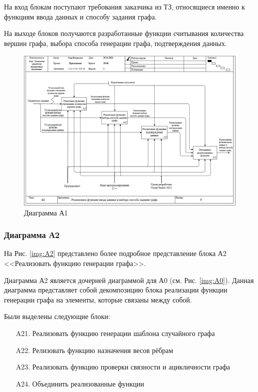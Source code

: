 \documentclass[a4paper, final]{article}
\begin{document}
На вход блокам поступают требования заказчика из ТЗ, относящиеся именно к функциям ввода данных и способу 
задания графа.

На выходе блоков получаются разработанные функции считывания количества вершин графа, выбора способа генерации графа,
подтверждения данных.
\newpage
\begin{figure}[H]
	\centering
	\includegraphics[width=\linewidth]{A1.png}
	\caption{Диаграмма А1}
	\label{img:A1}
\end{figure}


\subsubsection{Диаграмма А2}
На Рис. \ref{img:A2} представлено более подробное представление блока А2 <<Реализовать функцию генерации графа>>.

Диаграмма А2 является дочерней диаграммой для А0 (см. Рис. \ref{img:A0}). Данная диаграмма представляет собой декомпозицию
блока реализации функции генерации графа на элементы, которые связаны между собой. 

Были выделены следующие блоки:
\begin{itemize}
	\item[A21.] Реализовать функцию генерации шаблона случайного графа
	\item[A22.] Релизовать функцию назначения весов рёбрам
	\item[A23.] Реализовать функцию проверки связности и ацикличности графа
	\item[A24.] Объединить реализованные функции
\end{itemize} 
\end{document}
